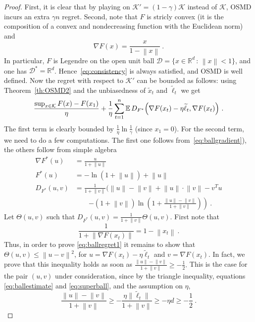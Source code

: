 \documentclass[11pt]{hackednow}
\newcommand{\E}{\mathbb{E}}
\newcommand{\R}{\mathbb{R}}
\newcommand{\cK}{\mathcal{K}}
\newcommand{\cD}{\mathcal{D}}
\renewcommand{\tilde}{\widetilde}
\newcommand{\norm}[1]{\left\|{#1}\right\|}
\begin{document}
\begin{proof}
First, it is clear that by playing on $\cK' = (1-\gamma)\cK$ instead of $\cK$, OSMD incurs an extra $\gamma n$ regret. Second, note that $F$ is stricly convex (it is the composition of a convex and nondecreasing function with the Euclidean norm) and
\begin{equation} \label{eq:ballgradient}
\nabla F (x) = \frac{x}{1 - \norm{x}}~.
\end{equation}
In particular, $F$ is Legendre on the open unit ball $\cD = \{x \in \R^d \,:\, \norm{x} < 1 \}$, and one has $\cD^* = \R^d$. Hence~\eqref{eq:consistency} is always satisfied, and OSMD is well defined. Now the regret with respect to $\cK'$ can be bounded as follows: using Theorem~\ref{th:OSMD2} and the unbiasedness of $\tilde{x}_t$ and $\tilde{\ell}_t$ we get
$$\frac{\sup_{x \in \cK} F(x) - F(x_1)}{\eta} + \frac{1}{\eta} \sum_{t=1}^n \E\,D_{F^*}\Bigl(\nabla F(x_t) - \eta \tilde{\ell}_t, \nabla F(x_t)\Bigr)~.$$
The first term is clearly bounded by $\frac{1}{\eta}\ln\frac{1}{\gamma}$ (since $x_1 = 0$). For the second term, we need to do a few computations. The first one follows from~\eqref{eq:ballgradient}), the others follow from simple algebra
\begin{align*}
\nabla F^* (u) & = \frac{u}{1 + \norm{u}}\\
F^*(u) & = - \ln (1 + \norm{u}) + \norm{u}\\
D_{F^*}(u, v) & = \frac{1}{1+\norm{v}} \bigg(\norm{u} - \norm{v} + \norm{u} \cdot \norm{v} - v^T u   \\
& \qquad \left. - (1+\norm{v}) \ln \left( 1 + \frac{\norm{u} - \norm{v}}{1 + \norm{v}}\right) \right)~.
\end{align*}
Let $\Theta(u,v)$ such that $D_{F^*}(u, v) = \frac{1}{1+\norm{v}} \Theta(u,v)$. First note that 
\begin{equation} \label{eq:superball}
\frac{1}{1+\norm{\nabla F (x_t)}} = 1 - \norm{x_t}~.
\end{equation}
Thus, in order to prove \eqref{eq:ballregret1} it remains to show that $\Theta(u,v) \leq \norm{u - v}^2$, for $ u = \nabla F(x_t) - \eta \tilde{\ell}_t$ and $v = \nabla F(x_t)$. In fact, we prove that this inequality holds as soon as $\frac{\norm{u} - \norm{v}}{1 + \norm{v}} \geq - \frac{1}{2} .$ This is the case for the pair $(u,v)$ under consideration, since by the triangle inequality, equations \eqref{eq:ballestimate} and \eqref{eq:superball}, and the assumption on $\eta$,
$$\frac{\norm{u} - \norm{v}}{1 + \norm{v}}  \geq - \frac{\eta \big\|\tilde{\ell}_t\big\|}{1 + \norm{v}} \geq - \eta d \geq - \frac{1}{2}~.$$

\end{proof}
\end{document}
